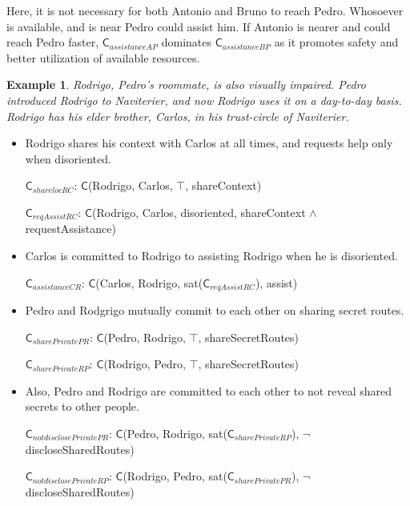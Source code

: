 \documentclass[11pt,          %
               phd,           %
               onehalfspacing %
               ]{ncsuthesis}
\newtheorem{example}{Example}
\newcommand{\msf}{\mathsf}
\newcommand{\C}{\msf{C}}
\newcommand{\navigationapp}{Naviterier\xspace}
\newcommand{\nsa}[1]{\textcolor{green!50!black}{NSA:~~#1}}
\newcommand{\mps}[1]{\textcolor{blue}{MPS:~~#1}}
\begin{document}

Here, it is not necessary for both Antonio and Bruno to reach Pedro.
Whosoever is available, and is near Pedro could assist him. If Antonio
is nearer and could reach Pedro faster, $\C_{assistanceAP}$ dominates
$\C_{assistanceBP}$ as it promotes safety and better utilization of
available resources.

\begin{example}
Rodrigo, Pedro's roommate, is also visually impaired. Pedro introduced
Rodrigo to \navigationapp, and now Rodrigo uses it on a day-to-day
basis. Rodrigo has his elder brother, Carlos, in his trust-circle of
\navigationapp.
\end{example}

\begin{itemize}

\item Rodrigo shares his context with Carlos at all times, and requests
help only when disoriented.

$\C_{sharelocRC}$: 
$\C$(Rodrigo, Carlos, $\top$, shareContext)

$\C_{reqAssistRC}$: 
$\C$(Rodrigo, Carlos, disoriented, shareContext $\land$ requestAssistance)

\item Carlos is committed to Rodrigo to assisting Rodrigo when he is disoriented.

$\C_{assistanceCR}$: $\C$(Carlos, Rodrigo, sat($\C_{reqAssistRC}$), assist)

\item Pedro and Rodgrigo mutually commit to each other on sharing secret routes. 

$\C_{sharePrivatePR}$: $\C$(Pedro, Rodrigo, $\top$, shareSecretRoutes)

$\C_{sharePrivateRP}$: $\C$(Rodrigo, Pedro, $\top$, shareSecretRoutes)

\item Also, Pedro and Rodrigo are committed to each other to not reveal shared secrets to other people. 

$\C_{notdisclosePrivatePR}$: $\C$(Pedro, Rodrigo, sat($\C_{sharePrivateRP}$), $\neg$ discloseSharedRoutes)

$\C_{notdisclosePrivateRP}$: $\C$(Rodrigo, Pedro, sat($\C_{sharePrivatePR}$), $\neg$ discloseSharedRoutes)
\end{itemize}
\end{document}
